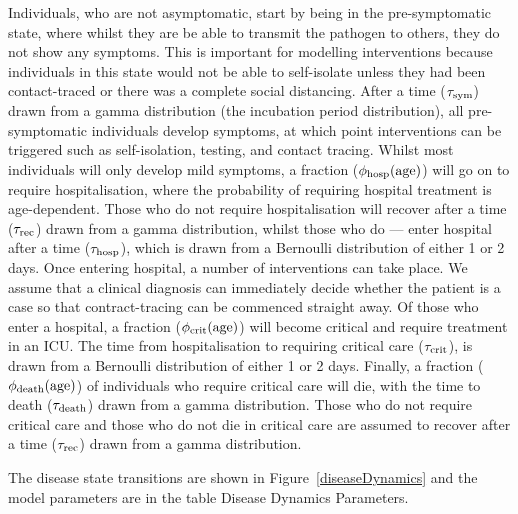 \documentclass[12pt, oneside]{amsart}   	%
\begin{document}
Individuals, who are not asymptomatic, start by being in the pre-symptomatic state, where whilst they are be able to transmit the pathogen to others, they do not show any symptoms. 
This is important for modelling interventions because individuals in this state would not be able to self-isolate unless they had been contact-traced or there was a complete social distancing. 
After a time ($\tau_{\rm sym}$) drawn from a gamma distribution (the incubation period distribution), all pre-symptomatic individuals develop symptoms, at which point interventions can be triggered such as self-isolation, testing, and contact tracing.
Whilst most individuals will only develop mild symptoms, a fraction ($\phi_{\rm hosp}({\rm age})$) will go on to require hospitalisation, where the probability of requiring hospital treatment is age-dependent.
Those who do not require hospitalisation will recover after a time ($\tau_{\rm rec}$) drawn from a gamma distribution, whilst those who do --- enter hospital after a time ($\tau_{\rm hosp}$), which is drawn from a Bernoulli distribution of either 1 or 2 days.
Once entering hospital, a number of interventions can take place. 
We assume that a clinical diagnosis can immediately decide whether the patient is a case so that contract-tracing can be commenced straight away.
Of those who enter a hospital, a fraction ($\phi_{\rm crit}({\rm age})$) will become critical and require treatment in an ICU. 
The time from hospitalisation  to requiring critical care ($\tau_{\rm crit}$), is drawn from a Bernoulli distribution of either 1 or 2 days.
Finally, a fraction ($\phi_{\rm death}({\rm age})$)  of individuals who require critical care will die, with the time to death ($\tau_{\rm death}$) drawn from a gamma distribution.
Those who do not require critical care and those who do not die in critical care are assumed to recover after a time ($\tau_{\rm rec}$) drawn from a gamma distribution.

The disease state transitions are shown in Figure~\ref{diseaseDynamics} and the model parameters are in the table Disease Dynamics Parameters.
\end{document}
